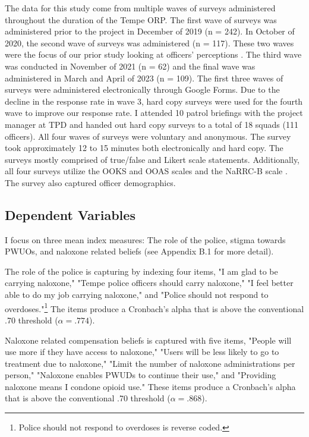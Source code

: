 The data for this study come from multiple waves of surveys administered throughout the duration of the Tempe ORP. The first wave of surveys was administered prior to the project in December of 2019 (n = 242). In October of 2020, the second wave of surveys was administered (n = 117). These two waves were the focus of our prior study looking at officers’ perceptions \parencite{white_narcan_2021}. The third wave was conducted in November of 2021 (n = 62) and the final wave was administered in March and April of 2023 (n = 109). The first three waves of surveys were administered electronically through Google Forms. Due to the decline in the response rate in wave 3, hard copy surveys were used for the fourth wave to improve our response rate.  I attended 10 patrol briefings with the project manager at TPD and handed out hard copy surveys to a total of 18 squads (111 officers). All four waves of surveys were voluntary and anonymous. The survey took approximately 12 to 15 minutes both electronically and hard copy. The surveys mostly comprised of true/false and Likert scale statements. Additionally, all four surveys utilize the OOKS and OOAS scales \parencite{williams_development_2013} and the NaRRC-B scale \parencite{winograd_concerns_2019}. The survey also captured officer demographics.

\subsection{Dependent Variables}

I focus on three mean index measures: The role of the police, stigma towards PWUOs, and naloxone related beliefs (see Appendix B.1 for more detail). 

The role of the police is capturing by indexing four items, "I am glad to be carrying naloxone," "Tempe police officers should carry naloxone," "I feel better able to do my job carrying naloxone," and "Police should not respond to overdoses."\footnote{Police should not respond to overdoses is reverse coded.} The items produce a Cronbach's alpha that is above the conventional .70 threshold (\(\alpha = .774\)).

Naloxone related compensation beliefs is captured with five items, "People will use more if they have access to naloxone," "Users will be less likely to go to treatment due to naloxone," "Limit the number of naloxone administrations per person," "Naloxone enables PWUDs to continue their use," and "Providing naloxone means I condone opioid use." These items produce a Cronbach's alpha that is above the conventional .70 threshold (\(\alpha = .868\)).

